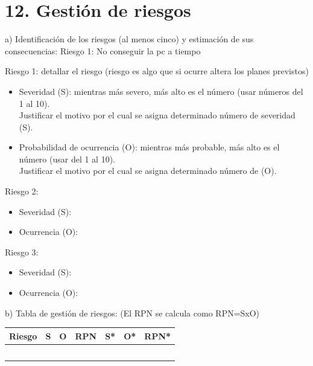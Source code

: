 \documentclass[11pt]{charter}
\begin{document}
\section{12. Gestión de riesgos}
\label{sec:riesgos}

a) Identificación de los riesgos (al menos cinco) y estimación de sus consecuencias:
Riesgo 1: No conseguir la pc a tiempo

Riesgo 1: detallar el riesgo (riesgo es algo que si ocurre altera los planes previstos)
\begin{itemize}
\item Severidad (S): mientras más severo, más alto es el número (usar números del 1 al 10).\\
Justificar el motivo por el cual se asigna determinado número de severidad (S).
\item Probabilidad de ocurrencia (O): mientras más probable, más alto es el número (usar del 1 al 10).\\
Justificar el motivo por el cual se asigna determinado número de (O). 
\end{itemize}   

Riesgo 2:
\begin{itemize}
\item Severidad (S): 
\item Ocurrencia (O):
\end{itemize}

Riesgo 3:
\begin{itemize}
\item Severidad (S): 
\item Ocurrencia (O):
\end{itemize}


b) Tabla de gestión de riesgos:      (El RPN se calcula como RPN=SxO)

\begin{table}[htpb]
\centering
\begin{tabularx}{\linewidth}{@{}|X|c|c|c|c|c|c|@{}}
\hline
\rowcolor[HTML]{C0C0C0} 
Riesgo & S & O & RPN & S* & O* & RPN* \\ \hline
       &   &   &     &    &    &      \\ \hline
       &   &   &     &    &    &      \\ \hline
       &   &   &     &    &    &      \\ \hline
       &   &   &     &    &    &      \\ \hline
       &   &   &     &    &    &      \\ \hline
\end{tabularx}%
\end{table}
\end{document}
